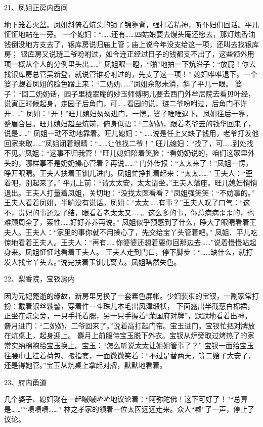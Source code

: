21、凤姐正房内西间\par
地下笼着火盆。凤姐斜倚着炕头的锁子锦靠背，强打着精神，听仆妇们回话。平儿怔怔地站在一旁。
一个媳妇：“……还有……四姑娘要去馒头庵还愿去，那灯烛香油钱倒没地方支去了，银库房说归庙上管；庙上说今年没支给这一项，还叫去找银库房；
银库房又说琏二爷吩咐过，如今连正经过日子的钱都支不出了，这些额外用项一概从个人的分例里头出……”
凤姐眼一瞪，“啪”地拍一下炕沿子：“放屁！你去找银库房总管吴新登，就说管谁吩咐过的，先支了这一项！”
媳妇唯唯退下。一个婆子觑着凤姐的脸色蹭上来：“二奶奶……”凤姐余怒未消，斜了平儿一眼。
婆子：“回二奶奶话，园子里栊翠庵的妙玉师傅明儿要去西门外牟尼院去看贝叶经，说寅正时候起身，走园子后角门，可……看园的说，琏二爷吩咐过，后角门不许开……”
凤姐：“开！”旺儿媳妇匆匆进门，一愣。婆子唯唯退下。凤姐往后一靠，蹙眉合目。旺儿媳妇趋至炕前，俯身低语：“二奶奶，跟着老爷去的钱华回来了，说是……”
凤姐一动不动地靠着。旺儿媳妇：“……说是任上又缺了钱用，老爷打发他回家来取……”凤姐闭着眼睛：“……让他找二爷！”
旺儿媳妇：“找了，可……到处找不见。”凤姐：“这事不归我管！”旺儿媳妇陪着笑脸：“看奶奶说的，咱们这家里外头的，哪样事不是奶奶操心管着？再说……”
门外传报：“太太来了！”凤姐一愣，睁开眼睛。王夫人扶着玉钏儿进门。凤姐忙挣扎着起来：“太太……” 王夫人：“歪着吧，别起来了。”
平儿上前：“请太太安，太太请坐。”王夫人落座。旺儿媳妇悄悄退出。王夫人打量着凤姐，关切地：“没找太医看看？”凤姐强笑笑：“不妨事的。”
王夫人看着凤姐，半晌没有说话。凤姐：“太太……有事？”王夫人叹了口气：“这不，贵妃的事还没了结，眼看着老太太又……。这么多的事，你总病病歪歪的，也难顾周全了，索性……好好养养再说。”
凤姐似乎预感到了什么，睁大了眼睛看着王夫人。王夫人：“家里的事你就不用操心了，先交给宝丫头管着吧。”
凤姐、平儿吃惊地看着王夫人。王夫人：“再有……你婆婆还想着要你回那边去……”说着慢慢站起身来。凤姐怔怔地看着王夫人。
王夫人走到门口，停下脚步：“……缺什么，就打发人找宝丫头去。”说完扶着玉钏儿离去。凤姐嗒然失色。

22、梨香院，宝钗房内\par
因为元妃薨逝的缘故，新房里另换了一套素色屏帐。少妇装束的宝钗，一副家常打扮：戴着银丝鬏髻，穿着件一斗珠儿本毛出风漳缎袄，
下面露出半截葱白棉裙，正坐在炕桌旁，一只手托着腮，另一只手握着“荣国府对牌”，默默地看着出神。
麝月进门：“二奶奶，二爷回来了。”说着高打起门帘。宝玉进门。宝钗忙把对牌放在炕桌上，起身迎上。
麝月上前服侍宝玉脱下外衣。宝钗从炉旁取过烤热了的家常实纳棉袍给宝玉换上。宝玉：“怎么听说太太让姐姐管事了？”
宝钗一面给宝玉往腰巾上挂着荷包、搬指套，一面微微笑着：“不过是替两天，等二嫂子大安了，还是得她管。”宝玉从炕桌上拿起对牌，默默地看着。

23、府内甬道\par
几个婆子、媳妇聚在一起嘁嘁喳喳地议论着：“阿弥陀佛！这下可好了！”“总算是……”“啧啧啧……”
林之孝家的领着一位太医远远走来。众人“嘘”了一声，停止了议论。

